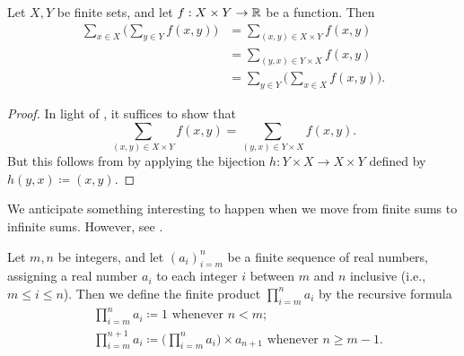 \begin{cor}\label{i:7.1.14}
  Let \(X, Y\) be finite sets, and let \(f : X \times Y \to \mathbb{R}\) be a function.
  Then
  \begin{align*}
    \sum_{x \in X} \bigg(\sum_{y \in Y} f(x, y)\bigg) & = \sum_{(x, y) \in X \times Y} f(x, y)               \\
                                                      & = \sum_{(y, x) \in Y \times X} f(x, y)               \\
                                                      & = \sum_{y \in Y} \bigg(\sum_{x \in X} f(x, y)\bigg).
  \end{align*}
\end{cor}

\begin{proof}
  In light of , it suffices to show that
  \[
    \sum_{(x, y) \in X \times Y} f(x, y) = \sum_{(y, x) \in Y \times X} f(x, y).
  \]
  But this follows from  by applying the bijection \(h : Y \times X \to X \times Y\) defined by \(h(y, x) \coloneqq (x, y)\).
\end{proof}

\begin{rmk}\label{i:7.1.15}
  We anticipate something interesting to happen when we move from finite sums to infinite sums.
  However, see .
\end{rmk}

\begin{ac}\label{i:ac:7.1.1}
  Let \(m, n\) be integers, and let \((a_i)_{i = m}^n\) be a finite sequence of real numbers, assigning a real number \(a_i\) to each integer \(i\) between \(m\) and \(n\) inclusive (i.e., \(m \leq i \leq n\)).
  Then we define the finite product \(\prod_{i = m}^n a_i\) by the recursive formula
  \begin{align*}
     & \prod_{i = m}^n a_i \coloneqq 1 \text{ whenever } n < m;                                                             \\
     & \prod_{i = m}^{n + 1} a_i \coloneqq \Bigg(\prod_{i = m}^n a_i\Bigg) \times a_{n + 1} \text{ whenever } n \geq m - 1.
  \end{align*}
\end{ac}

